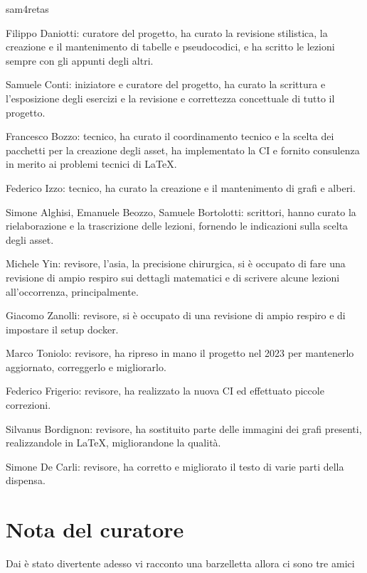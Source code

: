 \documentclass[class=book, crop=false, oneside, 12pt]{standalone}
\begin{document}
\begin{labeling}{sam4retas}
    \item[p!ps] Filippo Daniotti: curatore del progetto, ha curato la revisione stilistica, la creazione e il mantenimento di tabelle e pseudocodici, e ha scritto le lezioni sempre con gli appunti degli altri.
    \item[sam4retas] Samuele Conti: iniziatore e curatore del progetto, ha curato la scrittura e l'esposizione degli esercizi e la revisione e correttezza concettuale di tutto il progetto.
    \item[frab0zzo] Francesco Bozzo: tecnico, ha curato il coordinamento tecnico e la scelta dei pacchetti per la creazione degli asset, ha implementato la CI e fornito consulenza in merito ai problemi tecnici di \LaTeX.
    \item[f1zzo] Federico Izzo: tecnico, ha curato la creazione e il mantenimento di grafi e alberi.
    \item[t0k3n\$] Simone Alghisi, Emanuele Beozzo, Samuele Bortolotti: scrittori, hanno curato la rielaborazione e la trascrizione delle lezioni, fornendo le indicazioni sulla scelta degli asset.
    \item[ch!n4] Michele Yin: revisore, l'asia, la precisione chirurgica, si è occupato di fare una revisione di ampio respiro sui dettagli matematici e di scrivere alcune lezioni all'occorrenza, principalmente.
    \item[j4bb] Giacomo Zanolli: revisore, si è occupato di una revisione di ampio respiro e di impostare il setup docker.
    \item[Toniolo-Marco] Marco Toniolo: revisore, ha ripreso in mano il progetto nel 2023 per mantenerlo aggiornato, correggerlo e migliorarlo.
    \item[FrostWalk] Federico Frigerio: revisore, ha realizzato la nuova CI ed effettuato piccole correzioni.
    \item[silvanusbordignon] Silvanus Bordignon: revisore, ha sostituito parte delle immagini dei grafi presenti, realizzandole in \LaTeX, migliorandone la qualità.
    \item[Congiuntivo] Simone De Carli: revisore, ha corretto e migliorato il testo di varie parti della dispensa.
\end{labeling}  

\section*{Nota del curatore}
Dai è stato divertente adesso vi racconto una barzelletta allora ci sono tre amici
\end{document}
